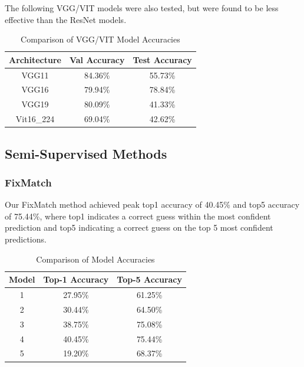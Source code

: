 \documentclass{article}
\begin{document}
The following VGG/VIT models were also tested, but were found to be less effective than the ResNet models.

\begin{table}[H]
    \centering
    \begin{tabular}{|c|c|c|}
        \hline
        Architecture & Val Accuracy & Test Accuracy \\
        \hline
        VGG11 & 84.36\% & 55.73\% \\
        \hline
        VGG16 & 79.94\% & 78.84\% \\
        \hline
        VGG19 & 80.09\% & 41.33\% \\
        \hline
        Vit16\_224 & 69.04\% & 42.62\% \\
        \hline
    \end{tabular}
    \caption{Comparison of VGG/VIT Model Accuracies}
    \label{tab:vgg_model_accuracies}
\end{table}
\subsection{Semi-Supervised Methods}
\subsubsection{FixMatch}

Our FixMatch method achieved peak top1 accuracy of 40.45\% and top5 accuracy of 75.44\%, where top1 indicates a correct guess within the most confident prediction and top5 indicating a correct guess on the top 5 most confident predictions.

\begin{table}[H]
    \centering
    \begin{tabular}{|c|c|c|}
        \hline
        Model & Top-1 Accuracy & Top-5 Accuracy \\
        \hline
        1 & 27.95\% & 61.25\% \\
        \hline
        2 & 30.44\% & 64.50\% \\
        \hline
        3 & 38.75\% & 75.08\% \\
        \hline
        4 & 40.45\% & 75.44\% \\
        \hline
        5 & 19.20\% & 68.37\% \\
        \hline
    \end{tabular}
    \caption{Comparison of Model Accuracies}
    \label{tab:fm_model_accuracies}
\end{table}
\end{document}
